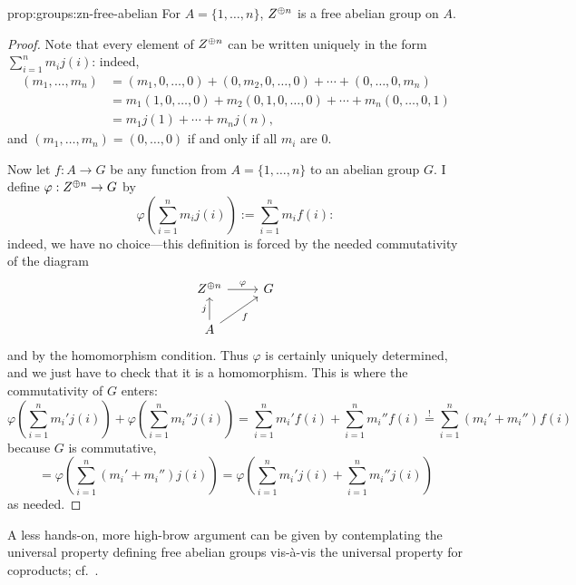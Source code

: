 \begin{prop}{}{prop:groups:zn-free-abelian}
  For $A = \{1, \dots, n\}$, $Z^{\oplus n}$ is a free
    abelian group on $A$.
\end{prop}
\begin{proof}
  Note that every element of $Z^{\oplus n}$ can be written uniquely
  in the form $\sum_{i=1}^n m_i j(i)$: indeed,
  \begin{align*}
    (m_1, \dots, m_n) &= (m_1, 0, \dots, 0) + (0, m_2, 0, \dots, 0) + \cdots
                        + (0, \dots, 0, m_n) \\
                      &= m_1(1, 0, \dots, 0) + m_2(0,1,0,\dots,0) + \cdots + m_n(0,\dots,0,1) \\
                      &= m_1 j(1) + \cdots + m_n j(n),
  \end{align*}
  and $(m_1, \dots, m_n) = (0, \dots, 0)$ if and only if all $m_i$ are
  $0$.

  Now let $f : A \to G$ be any function from $A = \{1, \dots, n\}$ to
  an abelian group $G$. I define $\varphi : Z^{\oplus n} \to G$ by
  \[
    \varphi\left( \sum_{i=1}^n m_i j(i) \right) := \sum_{i=1}^n m_i
    f(i):
  \]
  indeed, we have no choice---this definition is forced by the needed
  commutativity of the diagram
  \[
    \begin{tikzcd}
      \Z^{\oplus n} \arrow[r, "\varphi"] & G \\
      A \arrow[u, "j"] \arrow[ur, "f"'] &
    \end{tikzcd}
  \]
  and by the homomorphism condition. Thus $\varphi$ is certainly
  uniquely determined, and we just have to check that it is a
  homomorphism. This is where the commutativity of $G$ enters:
  \[
    \varphi\left( \sum_{i=1}^n m_i' j(i) \right) + \varphi\left(
      \sum_{i=1}^n m_i'' j(i) \right) = \sum_{i=1}^n m_i' f(i) +
    \sum_{i=1}^n m_i'' f(i) \overset{!}{=} \sum_{i=1}^n (m_i' + m_i'')
    f(i)
  \]
  because $G$ is commutative,
  \[
    = \varphi\left( \sum_{i=1}^n (m_i' + m_i'') j(i) \right) =
    \varphi\left( \sum_{i=1}^n m_i' j(i) + \sum_{i=1}^n m_i'' j(i)
    \right)
  \]
  as needed.
\end{proof}

\begin{rem}{}{}
  A less hands-on, more high-brow argument can be given by
  contemplating the universal property defining free abelian groups
  vis-\`{a}-vis the universal property for coproducts; cf.\
  .
\end{rem}

